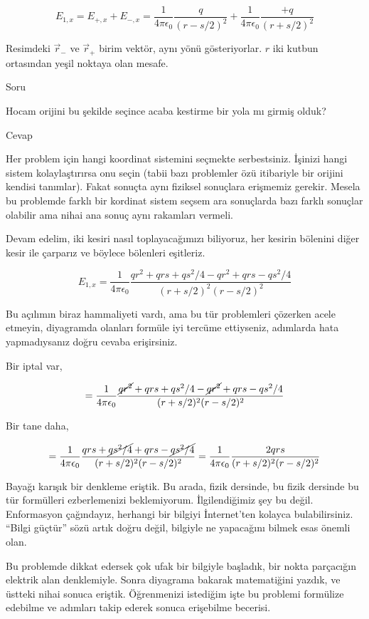 \documentclass[12pt,fleqn]{article}\usepackage{../../common}
\begin{document}
$$
E_{1,x} = E_{+,x} + E_{-,x} =
\frac{1}{4\pi\epsilon_0} \frac{q}{(r-s/2)^2} +
\frac{1}{4\pi\epsilon_0} \frac{+q}{(r+s/2)^2} 
$$

Resimdeki $\vec{r}_{-}$ ve $\vec{r}_{+}$ birim vektör, aynı yönü
gösteriyorlar. $r$ iki kutbun ortasından yeşil noktaya olan mesafe. 

Soru

Hocam orijini bu şekilde seçince acaba kestirme bir yola mı girmiş olduk?

Cevap

Her problem için hangi koordinat sistemini seçmekte serbestsiniz. İşinizi hangi
sistem kolaylaştırırsa onu seçin (tabii bazı problemler özü itibariyle bir
orijini kendisi tanımlar). Fakat sonuçta aynı fiziksel sonuçlara erişmemiz
gerekir. Mesela bu problemde farklı bir kordinat sistem seçsem ara sonuçlarda
bazı farklı sonuçlar olabilir ama nihai ana sonuç aynı rakamları vermeli.

Devam edelim, iki kesiri nasıl toplayacağımızı biliyoruz, her kesirin bölenini
diğer kesir ile çarparız ve böylece bölenleri eşitleriz.

$$
E_{1,x} =
\frac{1}{4\pi\epsilon_0}
\frac{qr^2 + qrs + qs^2 / 4 - qr^2 + qrs - qs^2 / 4}
     {(r+s/2)^2  (r-s/2)^2 } 
$$

Bu açılımın biraz hammaliyeti vardı, ama bu tür problemleri çözerken acele
etmeyin, diyagramda olanları formüle iyi tercüme ettiyseniz, adımlarda hata
yapmadıysanız doğru cevaba erişirsiniz. 

Bir iptal var,

$$
=
\frac{1}{4\pi\epsilon_0}
\frac{\cancel{qr^2} + qrs + qs^2 / 4 - \cancel{qr^2} + qrs - qs^2 / 4}
     {(r+s/2)^2  (r-s/2)^2 } 
$$

Bir tane daha,
     
$$
= 
\frac{1}{4\pi\epsilon_0}
\frac{qrs + \cancel{qs^2 / 4} + qrs - \cancel{qs^2 / 4}}
     {(r+s/2)^2  (r-s/2)^2 }  =
\frac{1}{4\pi\epsilon_0}
\frac{2 qrs} {(r+s/2)^2  (r-s/2)^2 }       
$$

Bayağı karışık bir denkleme eriştik. Bu arada, fizik dersinde, bu fizik dersinde
bu tür formülleri ezberlemenizi beklemiyorum. İlgilendiğimiz şey bu
değil. Enformasyon çağındayız, herhangi bir bilgiyi İnternet'ten kolayca
bulabilirsiniz. ``Bilgi güçtür'' sözü artık doğru değil, bilgiyle ne yapacağını
bilmek esas önemli olan.

Bu problemde dikkat edersek çok ufak bir bilgiyle başladık, bir nokta parçacığın
elektrik alan denklemiyle. Sonra diyagrama bakarak matematiğini yazdık, ve
üstteki nihai sonuca eriştik. Öğrenmenizi istediğim işte bu problemi formülize
edebilme ve adımları takip ederek sonuca erişebilme becerisi. 
\end{document}
